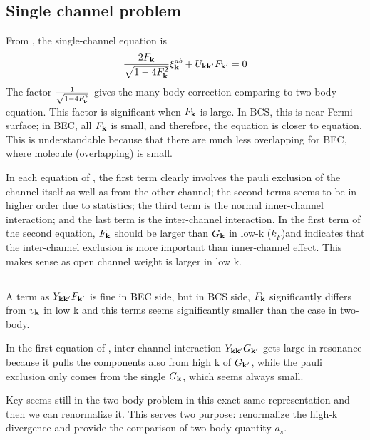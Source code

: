 \subsection{Single channel problem}
From , the single-channel equation is 
\begin{equation}
\frac{2F_{\mathbf{k}}}{\sqrt{1-4 F_{\mathbf{k}}^2}} \xi^{ab}_{\mathbf{k}}+U_{\mathbf{k}\mathbf{k}'}F_{\mathbf{k}'}=0
\end{equation}
The factor $\frac{1}{\sqrt{1-4 F_{\mathbf{k}}^2}}$ gives the many-body correction comparing to two-body \sch equation.  This factor is significant when $F_{\mathbf{k}}$ is large.  In BCS, this is near Fermi surface;  in BEC, all $F_{\mathbf{k}}$ is small, and therefore, the equation is closer to \sch  equation.  This is understandable because that there are much less overlapping for BEC, where molecule (overlapping) is small.  

In each equation of ,  the first term clearly involves the pauli exclusion of the channel itself as well as from the other channel;  the second terms seems to be in higher order due to statistics;  the third term is the normal inner-channel interaction; and the last term is the inter-channel interaction.  In the first term of the second equation,  $F_{\mathbf{k}}$ should be larger than $G_{\mathbf{k}}$ in low-k ($k_{F}$)and indicates that the inter-channel exclusion is more important than inner-channel effect.  This makes sense as open channel weight is larger in low k.  

\subsection{}
A term as $Y_{\mathbf{k}\mathbf{k}'}F_{\mathbf{k}'}$ is fine in BEC side, but in BCS side, $F_{\mathbf{k}}$ significantly differs from $v_{\mathbf{k}}$ in low k and this terms seems significantly smaller than the case in two-body. 

In the first equation of , inter-channel interaction $Y_{\mathbf{k}\mathbf{k}'}G_{\mathbf{k}'}$ gets large in resonance because it pulls the components also from high k of $G_{\mathbf{k}'}$, while the pauli exclusion only comes from the single $G_{\mathbf{k}}$, which seems always small.  

Key seems still in the two-body problem in this exact same representation and then we can renormalize it.  This serves two purpose: renormalize the high-k divergence and provide the comparison of two-body quantity $a_{s}$.

